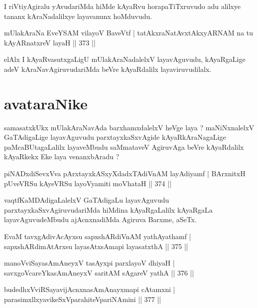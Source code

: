 \begin{artha}
I riVtiyAgiralu yAvudariMda hiMde kAyaRvu horapaTiTxruvudo adu alilxye tananx kAraNadalilxye layavanunx hoMduvudu.
\end{artha}

\begin{shl}
mUlakAraNa EveYSAM vilayoV BaveVtf |
tatAkxraNatAvxtAkxyARNAM na tu kAyARnatxreV layaH \hfill || 373 ||
\end{shl}

\begin{artha}
elAlx I kAyaRvasutxgaLigU mUlakAraNadalelxV layavAguvudu, kAyaR\-gaLige adeV kAraNavAgiruvudariMda beVre kAyaRdalilx layaviruvudilalx.
\end{artha}

\section*{avataraNike}

\begin{artha}
samasatxkUkx mUlakAraNavAda barxhamxdalelxV heVge laya ? maNiNxnalelxV GaTAdigaLige layavAguvudu parxtayxkaSxvAgide kAyaRkAraNagaLige paMcaBUtagaLalilx laya\-veMbudu saMmataveV AgiruvAga beVre kAyaRdalilx kAyaRkekx Eke laya venanxbAradu ?
\end{artha}

\begin{shl}
piNADxdiSevxVva pArxtayxkASxyXdadxTAdiVnAM layAdiyamf |
BArxnitxH pUveVRSu kAyeVRSu layoV\s yamiti moVhataH \hfill || 374 ||
\end{shl}

\begin{artha}
vaqtfKaMDAdigaLalelxV GaTAdigaLu layavAguvudu parxtayxkaSxvAgiruvudariMda hiMdina kAyaRgaLalilx kAyaRgaLa layavAguvudeMbudu ajAcnxnadiMda Agiruva Barxme, aSeTx.
\end{artha}

\begin{shl}
EvaM tavxgAdivAcAyxsu sapxshARdiVnAM yathAyathamf |
sapxshARdimAtArxsu layasAtxsAmapi layasatxthA \hfill || 375 ||
\end{shl}
\begin{shl}
manoVviSayasAmAneyxV tasAyxpi parxlayoV dhiyaH |
savxgoVcareYkasAmAneyxV saritAM sAgareV yathA \hfill || 376 ||
\end{shl}
\begin{shl}
budedhxVviRSayavijAcnxnasAmAnayxmapi cA\s \s tamxni |
parasimxllxyavikeSxVparahiteV\s pariNAmini \hfill || 377 ||
\end{shl}

